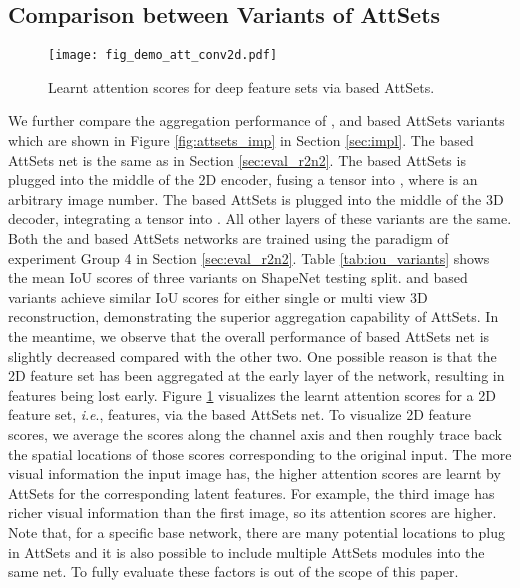 \documentclass[twocolumn]{svjour3}    \pdfoutput=1
\newcommand{\nickname}{AttSets}
\newcommand{\ie}{\textit{i}.\textit{e}., }
\begin{document}
\vspace{-0.45cm}
\subsection{Comparison between Variants of \nickname{}}\label{sec:variants}
\begin{figure}\vspace{-0.15cm}
\centering
   \texttt{[image: fig\_demo\_att\_conv2d.pdf]}
\caption{Learnt attention scores for deep feature sets via  based \nickname{}.}
\label{fig:atts_w}
\vspace{-0.35cm}
\end{figure}

We further compare the aggregation performance of ,  and  based \nickname{} variants which are shown in Figure \ref{fig:attsets_imp} in Section \ref{sec:impl}. The  based \nickname{} net is the same as in Section \ref{sec:eval_r2n2}. The  based \nickname{} is plugged into the middle of the 2D encoder, fusing a  tensor into , where  is an arbitrary image number. The  based \nickname{} is plugged into the middle of the 3D decoder, integrating a  tensor into . All other layers of these variants are the same. Both the  and  based \nickname{} networks are trained using the paradigm of experiment Group 4 in Section \ref{sec:eval_r2n2}.
Table \ref{tab:iou_variants} shows the mean IoU scores of three variants on ShapeNet testing split.  and  based variants achieve similar IoU scores for either single or multi view 3D reconstruction, demonstrating the superior aggregation capability of \nickname{}. In the meantime, we observe that the overall performance of  based \nickname{} net is slightly decreased compared with the other two. One possible reason is that the 2D feature set has been aggregated at the early layer of the network, resulting in features being lost early. Figure \ref{fig:atts_w} visualizes the learnt attention scores for a 2D feature set, \ie  features, via the  based \nickname{} net. To visualize 2D feature scores, we average the scores along the channel axis and then roughly trace back the spatial locations of those scores corresponding to the original input. The more visual information the input image has, the higher attention scores are learnt by \nickname{} for the corresponding latent features. For example, the third image has richer visual information than the first image, so its attention scores are higher. Note that, for a specific base network, there are many potential locations to plug in \nickname{} and it is also possible to include multiple \nickname{} modules into the same net. To fully evaluate these factors is out of the scope of this paper.
\end{document}
